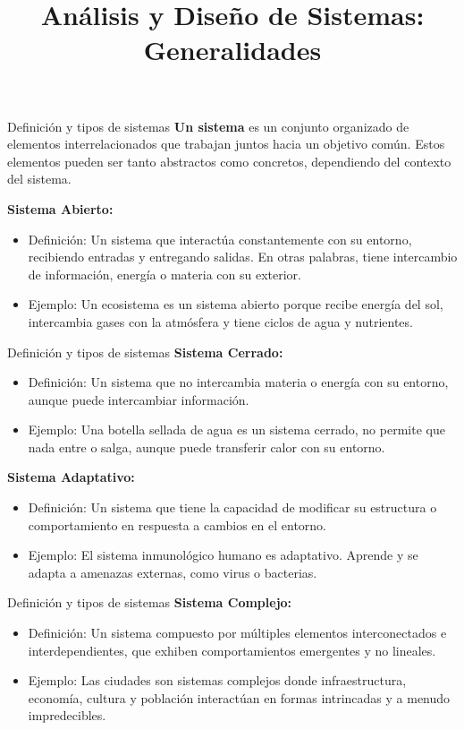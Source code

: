 \documentclass{beamer}
\title{Análisis y Diseño de Sistemas: Generalidades}
\author{}
\date{}
\begin{document}
\begin{frame}
\titlepage
\end{frame}

\begin{frame}{Definición y tipos de sistemas}
\textbf{Un sistema} es un conjunto organizado de elementos interrelacionados que trabajan juntos hacia un objetivo común. Estos elementos pueden ser tanto abstractos como concretos, dependiendo del contexto del sistema.

\textbf{Sistema Abierto:}
\begin{itemize}
    \item Definición: Un sistema que interactúa constantemente con su entorno, recibiendo entradas y entregando salidas. En otras palabras, tiene intercambio de información, energía o materia con su exterior.
    \item Ejemplo: Un ecosistema es un sistema abierto porque recibe energía del sol, intercambia gases con la atmósfera y tiene ciclos de agua y nutrientes.
\end{itemize}
\end{frame}

\begin{frame}{Definición y tipos de sistemas }
\textbf{Sistema Cerrado:}
\begin{itemize}
    \item Definición: Un sistema que no intercambia materia o energía con su entorno, aunque puede intercambiar información.
    \item Ejemplo: Una botella sellada de agua es un sistema cerrado, no permite que nada entre o salga, aunque puede transferir calor con su entorno.
\end{itemize}

\textbf{Sistema Adaptativo:}
\begin{itemize}
    \item Definición: Un sistema que tiene la capacidad de modificar su estructura o comportamiento en respuesta a cambios en el entorno.
    \item Ejemplo: El sistema inmunológico humano es adaptativo. Aprende y se adapta a amenazas externas, como virus o bacterias.
\end{itemize}
\end{frame}

\begin{frame}{Definición y tipos de sistemas }
\textbf{Sistema Complejo:}
\begin{itemize}
    \item Definición: Un sistema compuesto por múltiples elementos interconectados e interdependientes, que exhiben comportamientos emergentes y no lineales.
    \item Ejemplo: Las ciudades son sistemas complejos donde infraestructura, economía, cultura y población interactúan en formas intrincadas y a menudo impredecibles.
\end{itemize}
\end{frame}
\end{document}
